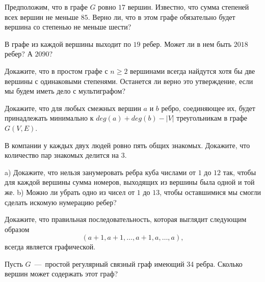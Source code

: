 \begin{exersize}
	Предположим, что в графе $G$ ровно $17$ вершин. Известно, что сумма степеней всех вершин не меньше $85$. Верно ли, что в этом графе обязательно будет вершина со степенью не меньше шести?
\end{exersize}

\begin{exersize}
	В графе из каждой вершины выходит по $19$ ребер. Может ли в нем быть $2018$ ребер? А $2090$?
\end{exersize}

\begin{exersize}
	Докажите, что в простом графе с $n \geqslant 2$ вершинами всегда найдутся хотя бы две вершины с одинаковыми степенями. Останется ли верно это утверждение, если мы будем иметь дело с мультиграфом?
\end{exersize}

\begin{exersize}
	Докажите, что для любых смежных вершин $a$ и $b$ ребро, соединяющее их, будет принадлежать минимально к $deg (a) + deg (b) - |V|$ треугольникам в графе $G(V, E)$.
\end{exersize}

\begin{exersize}
	В компании у каждых двух людей ровно пять общих знакомых. Докажите, что количество пар знакомых делится на 3.
\end{exersize}

\begin{exersize}
	a) Докажите, что нельзя занумеровать ребра куба числами от $1$ до $12$ так, чтобы для каждой вершины сумма номеров, выходящих из вершины была одной и той же. b) Можно ли убрать одно из чисел от $1$ до $13$, чтобы оставшимися мы смогли сделать искомую нумерацию ребер?
\end{exersize}

\begin{exersize}
	Докажите, что правильная последовательность, которая выглядит следующим образом
	 $$(a+1, a+1, \dots, a+1, a, \dots, a),$$
	 всегда является графической.
\end{exersize}

\begin{exersize}
	Пусть $G$~---~простой регулярный связный граф имеющий 34 ребра. Сколько вершин может содержать этот граф?
\end{exersize}

